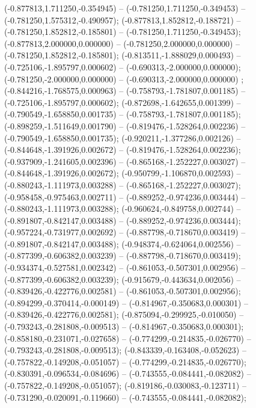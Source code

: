  (-0.877813,1.711250,-0.354945) -- (-0.781250,1.711250,-0.349453) -- (-0.781250,1.575312,-0.490957);
 (-0.877813,1.852812,-0.188721) -- (-0.781250,1.852812,-0.185801) -- (-0.781250,1.711250,-0.349453);
 (-0.877813,2.000000,0.000000) -- (-0.781250,2.000000,0.000000) -- (-0.781250,1.852812,-0.185801);
 (-0.813511,-1.888029,0.000493) -- (-0.725106,-1.895797,0.000602) -- (-0.690313,-2.000000,0.000000);
 (-0.781250,-2.000000,0.000000) -- (-0.690313,-2.000000,0.000000) ;
 (-0.844216,-1.768575,0.000963) -- (-0.758793,-1.781807,0.001185) -- (-0.725106,-1.895797,0.000602);
 (-0.872698,-1.642655,0.001399) -- (-0.790549,-1.658850,0.001735) -- (-0.758793,-1.781807,0.001185);
 (-0.898259,-1.511649,0.001790) -- (-0.819476,-1.528264,0.002236) -- (-0.790549,-1.658850,0.001735);
 (-0.920211,-1.377286,0.002126) -- (-0.844648,-1.391926,0.002672) -- (-0.819476,-1.528264,0.002236);
 (-0.937909,-1.241605,0.002396) -- (-0.865168,-1.252227,0.003027) -- (-0.844648,-1.391926,0.002672);
 (-0.950799,-1.106870,0.002593) -- (-0.880243,-1.111973,0.003288) -- (-0.865168,-1.252227,0.003027);
 (-0.958458,-0.975463,0.002711) -- (-0.889252,-0.974236,0.003444) -- (-0.880243,-1.111973,0.003288);
 (-0.960624,-0.849758,0.002744) -- (-0.891807,-0.842147,0.003488) -- (-0.889252,-0.974236,0.003444);
 (-0.957224,-0.731977,0.002692) -- (-0.887798,-0.718670,0.003419) -- (-0.891807,-0.842147,0.003488);
 (-0.948374,-0.624064,0.002556) -- (-0.877399,-0.606382,0.003239) -- (-0.887798,-0.718670,0.003419);
 (-0.934374,-0.527581,0.002342) -- (-0.861053,-0.507301,0.002956) -- (-0.877399,-0.606382,0.003239);
 (-0.915679,-0.443634,0.002056) -- (-0.839426,-0.422776,0.002581) -- (-0.861053,-0.507301,0.002956);
 (-0.894299,-0.370414,-0.000149) -- (-0.814967,-0.350683,0.000301) -- (-0.839426,-0.422776,0.002581);
 (-0.875094,-0.299925,-0.010050) -- (-0.793243,-0.281808,-0.009513) -- (-0.814967,-0.350683,0.000301);
 (-0.858180,-0.231071,-0.027658) -- (-0.774299,-0.214835,-0.026770) -- (-0.793243,-0.281808,-0.009513);
 (-0.843339,-0.163408,-0.052623) -- (-0.757822,-0.149208,-0.051057) -- (-0.774299,-0.214835,-0.026770);
 (-0.830391,-0.096534,-0.084696) -- (-0.743555,-0.084441,-0.082082) -- (-0.757822,-0.149208,-0.051057);
 (-0.819186,-0.030083,-0.123711) -- (-0.731290,-0.020091,-0.119660) -- (-0.743555,-0.084441,-0.082082);
